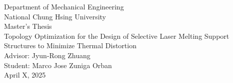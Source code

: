 \documentclass[../main.tex]{subfiles}
\begin{document}
	
	\thispagestyle{empty}
  \begin{center}
    \vspace{0.5cm}

    \LARGE 
    Department of Mechanical Engineering \\
    National Chung Hsing University \\
    Master's Thesis \\
    \vspace{3cm}
    Topology Optimization for the Design of Selective Laser Melting Support Structures to Minimize Thermal Distortion\\
    \vspace{3cm}
    Advisor: Jyun-Rong Zhuang \\
    Student: Marco Jose Zuniga Orban \\
    \vspace{3cm}
    April X, 2025 \\
   
  \end{center}
\end{document}

